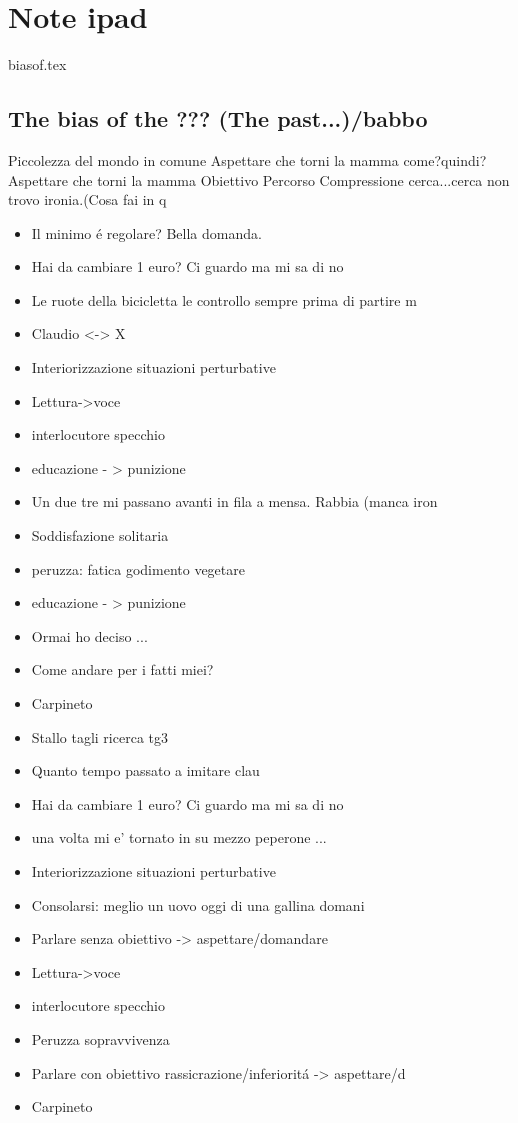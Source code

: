 \chapter{Note ipad}
\PartialToc

\begin{filecontents}{biasof.tex}

\section{The bias of the ??? (The past...)/babbo}

Piccolezza del mondo in comune
Aspettare che torni la mamma
come?quindi?
Aspettare che torni la mamma
Obiettivo Percorso
Compressione cerca...cerca non trovo ironia.(Cosa fai in q

\begin{itemize}
\item Il minimo \'e regolare? Bella domanda.
\item Hai da cambiare 1 euro? Ci guardo ma mi sa di no
\item Le ruote della bicicletta le controllo sempre prima di partire m
\item Claudio <-> X
\item Interiorizzazione situazioni perturbative
\item Lettura->voce
\item interlocutore specchio
\item educazione - > punizione
\item Un due tre mi passano avanti in fila a mensa. Rabbia (manca iron
\item Soddisfazione solitaria
\item peruzza: fatica godimento vegetare
\item educazione - > punizione
\item Ormai ho deciso ...
\item Come andare per i fatti miei?
\item Carpineto
\item Stallo tagli ricerca tg3
\item Quanto tempo passato a imitare clau
\item Hai da cambiare 1 euro? Ci guardo ma mi sa di no
\item una volta mi e' tornato in su mezzo peperone ...
\item Interiorizzazione situazioni perturbative
\item Consolarsi: meglio un uovo oggi di una gallina domani
\item Parlare senza obiettivo -> aspettare/domandare
\item Lettura->voce
\item interlocutore specchio
\item Peruzza sopravvivenza
\item Parlare con obiettivo rassicrazione/inferiorit\'a -> aspettare/d
\item Carpineto

\end{itemize}
\end{filecontents}

